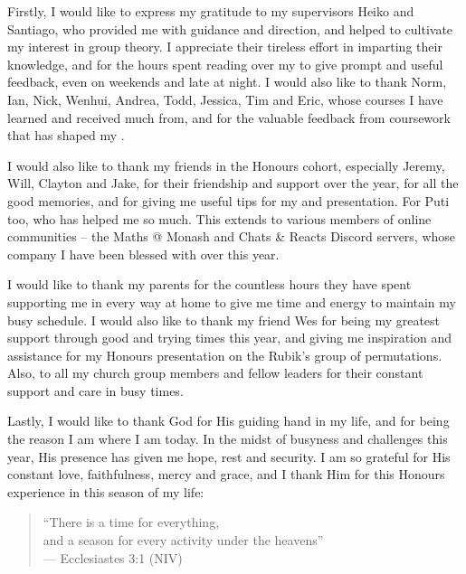 Firstly, I would like to express my gratitude to my supervisors Heiko and Santiago, who provided me with guidance and direction, and helped to cultivate my interest in group theory. I appreciate their tireless effort in imparting their knowledge, and for the hours spent reading over my \thesis{} to give prompt and useful feedback, even on weekends and late at night. I would also like to thank Norm, Ian, Nick, Wenhui, Andrea, Todd, Jessica, Tim and Eric, whose courses I have learned and received much from, and for the valuable feedback from coursework that has shaped my \thesis{}.

I would also like to thank my friends in the Honours cohort, especially Jeremy, Will, Clayton and Jake, for their friendship and support over the year, for all the good memories, and for giving me useful tips for my \thesis{} and presentation. For Puti too, who has helped me so much. This extends to various members of online communities -- the Maths @ Monash and Chats \& Reacts Discord servers, whose company I have been blessed with over this year.

I would like to thank my parents for the countless hours they have spent supporting me in every way at home to give me time and energy to maintain my busy schedule. I would also like to thank my friend Wes for being my greatest support through good and trying times this year, and giving me inspiration and assistance for my Honours presentation on the Rubik's group of permutations. Also, to all my church group members and fellow leaders for their constant support and care in busy times.

Lastly, I would like to thank God for His guiding hand in my life, and for being the reason I am where I am today. In the midst of busyness and challenges this year, His presence has given me hope, rest and security. I am so grateful for His constant love, faithfulness, mercy and grace, and I thank Him for this Honours experience in this season of my life:

\begin{quote}
    ``There is a time for everything, \\
    \hspace*{15pt} and a season for every activity under the heavens'' \\
    \null\hfill --- Ecclesiastes 3:1 (NIV)
\end{quote}